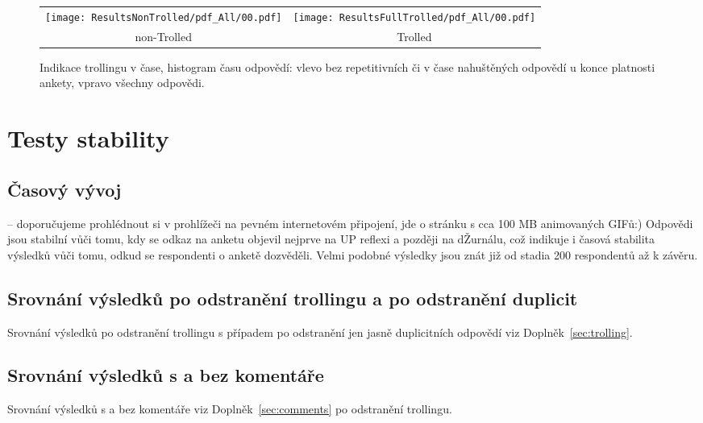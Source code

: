 \documentclass[a4paper,twoside]{article}
\begin{document}
\begin{figure}[!h]
\begin{tabular}{cc}
{  \texttt{[image: ResultsNonTrolled/pdf\_All/00.pdf]} } & 
{  \texttt{[image: ResultsFullTrolled/pdf\_All/00.pdf]}} \\
 non-Trolled & Trolled \\

\end{tabular}
\caption{Indikace trollingu v čase, histogram času odpovědí: vlevo bez repetitivních či v čase nahuštěných odpovědí u konce platnosti ankety, vpravo všechny odpovědi.}
\label{fig:troll_indication}
\end{figure}


\section{Testy stability}

\subsection{Časový vývoj}
 -- doporučujeme prohlédnout si v prohlížeči na pevném internetovém připojení, jde o stránku s cca 100 MB animovaných GIFů:) Odpovědi jsou stabilní vůči tomu, kdy se odkaz na anketu objevil nejprve na UP reflexi a později na dŽurnálu, což indikuje i časová stabilita výsledků vůči tomu, odkud se respondenti o anketě dozvěděli. Velmi podobné výsledky jsou znát již od stadia 200 respondentů až k závěru.

\subsection{Srovnání výsledků po odstranění trollingu a po odstranění duplicit}
Srovnání výsledků po odstranění trollingu s případem po odstranění jen jasně duplicitních odpovědí viz Doplněk~\ref{sec:trolling}.

\subsection{Srovnání výsledků s a bez komentáře}
Srovnání výsledků s a bez komentáře viz Doplněk~\ref{sec:comments} po odstranění trollingu.

\end{document}
